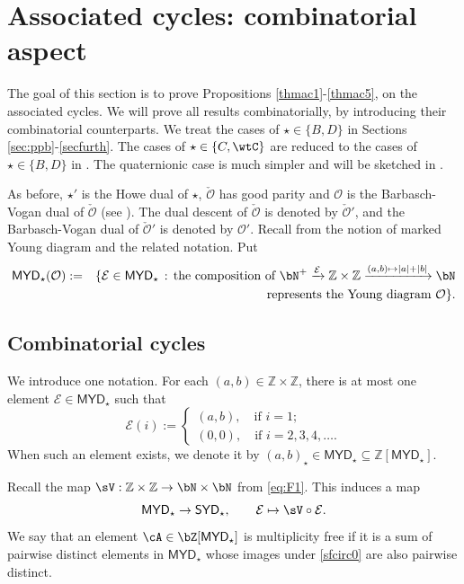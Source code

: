 \documentclass[11pt,a4paper]{amsart}
\def\SYD{{\mathsf{SYD}}}
\def\MYD{{\mathsf{MYD}}}
\def\abs#1{\left|{#1}\right|}
\newcommand{\CE}{{\mathcal {E}}}
\newcommand{\CO}{{\mathcal {O}}}
\newcommand{\Z}{\mathbb{Z}}
\def\DD{\nabla}
\newcommand{\be}{\begin {equation}}
\newcommand{\ee}{\end {equation}}
\numberwithin{equation}{section}
\theoremstyle{remark}
\def\subset{\subseteq}
\def\SYD{{\mathsf{SYD}}}
\def\MYD{{\mathsf{MYD}}}
\begin{document}
\section{Associated cycles: combinatorial aspect}
\label{sec:ACC}

\def\dsign{{}^d\mathrm{Sign}}

\def\acm{\cL}
\def\acme{\tilde{\cL}}
\def\dlifttso{{\check \vartheta}_{\sfss_{\tau'},\cO'}^{\sfss_{\tau},\;\cO}}
\def\DDtss{\DD_{\sfss_{\tau'}}^{\sfss_{\tau}}}
\def\taut{\tau_{\bftt}}

The goal of this section is to prove Propositions \ref{thmac1}-\ref{thmac5}, on the associated cycles. We will prove all results combinatorially, by introducing their combinatorial counterparts.
We treat the cases of $\star\in \{B,D\}$ in Sections \ref{sec:ppb}-\ref{secfurth}. The cases of  $\star\in \{C,\wtC\}$ are reduced to the cases of  $\star\in \{B,D\}$ in . The quaternionic case is much simpler and will be sketched in . 

As before, $\star'$ is the Howe dual of $\star$, $\check \CO$ has good parity and  $\CO$ is the Barbasch-Vogan dual of $\check \CO$ (see ). The dual descent of $\check \CO$ is denoted by $\check \CO'$, and the Barbasch-Vogan dual of $\check \CO'$ is denoted by $\CO'$.  Recall from  the notion of marked Young diagram and the related notation. Put
\begin{eqnarray*}
\MYD_\star(\CO)&:=&\{\CE\in \MYD_\star\,:\, \textrm{the composition of $\bN^+\xrightarrow{\CE} \Z\times \Z\xrightarrow{(a,b)\mapsto \abs{a}+\abs{b}}\bN$}\\
&&\qquad \qquad \qquad \textrm{represents the Young diagram $\CO$}\}. 
\end{eqnarray*}


\subsection{Combinatorial cycles}
We introduce one notation. For each $(a,b)\in \Z\times \Z$, there is at most one element $\CE\in \MYD_\star$ such that 
\[
  \CE(i):=\begin{cases}
    (a,b),\quad\textrm{if $i=1$;}
    \\
    (0,0),\quad\textrm{if $i=2,3,4, \dots$.}
  \end{cases}
\] When such an element exists, we denote it by $(a,b)_\star\in \MYD_\star\subset\Z[\MYD_\star]$. 


Recall the map $\sV: \Z\times \Z  \rightarrow \bN\times \bN$ from \eqref{eq:F1}. This induces a map
\be\label{sfcirc0}
 \MYD_\star\rightarrow \SYD_\star,\qquad \CE\mapsto \sV \circ \CE.
 \ee
 We say that an element $\cA \in \bZ[\MYD_\star]$ is multiplicity free if it is a sum of
pairwise distinct elements in $\MYD_\star$ whose images under \eqref{sfcirc0} are also pairwise distinct. 
\end{document}
